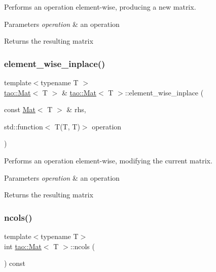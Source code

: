 Performs an operation element-\/wise, producing a new matrix. 


\begin{DoxyParams}{Parameters}
{\em operation} & an operation \\
\hline
\end{DoxyParams}
\begin{DoxyReturn}{Returns}
the resulting matrix 
\end{DoxyReturn}
\mbox{\label{classtao_1_1_mat_adf31d67ec117de70423499bfa81f124c}} 
\subsubsection{\texorpdfstring{element\_wise\_inplace()}{element\_wise\_inplace()}}
{\footnotesize\ttfamily template$<$typename T $>$ \\
\mbox{\hyperlink{classtao_1_1_mat}{tao\+::\+Mat}}$<$ T $>$ \& \mbox{\hyperlink{classtao_1_1_mat}{tao\+::\+Mat}}$<$ T $>$\+::element\+\_\+wise\+\_\+inplace (\begin{DoxyParamCaption}\item[{const \mbox{\hyperlink{classtao_1_1_mat}{Mat}}$<$ T $>$ \&}]{rhs,  }\item[{std\+::function$<$ T(T, T)$>$}]{operation }\end{DoxyParamCaption})}



Performs an operation element-\/wise, modifying the current matrix. 


\begin{DoxyParams}{Parameters}
{\em operation} & an operation \\
\hline
\end{DoxyParams}
\begin{DoxyReturn}{Returns}
the resulting matrix 
\end{DoxyReturn}
\mbox{\label{classtao_1_1_mat_ae13a111423bb288f81a3c2ff132955f7}} 
\subsubsection{\texorpdfstring{ncols()}{ncols()}}
{\footnotesize\ttfamily template$<$typename T$>$ \\
int \mbox{\hyperlink{classtao_1_1_mat}{tao\+::\+Mat}}$<$ T $>$\+::ncols (\begin{DoxyParamCaption}{ }\end{DoxyParamCaption}) const\hspace{0.3cm}{\ttfamily [inline]}}



